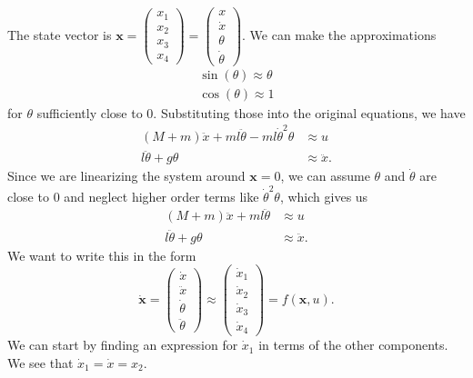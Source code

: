 \documentclass[12pt]{article}
\newcommand{\dx}{\dot{x}}
\newcommand{\dth}{\dot{\theta}}
\newcommand{\bx}{\textbf{x}}
\newcommand{\dbx}{\dot{\bx}}
\newcommand{\ddx}{\ddot{x}}
\newcommand{\ddth}{\ddot{\theta}}
\begin{document}
The state vector is $\bx = \begin{pmatrix} x_1 \\ x_2 \\ x_3 \\ x_4 \end{pmatrix} = \begin{pmatrix} x \\ \dx \\ \theta \\ \dth \end{pmatrix}$. We can make the approximations
\begin{align*}
\sin(\theta) \approx \theta \\
\cos(\theta) \approx 1
\end{align*}
for $\theta$ sufficiently close to $0$. Substituting those into the original equations, we have
\begin{align*}
(M + m)\ddx + ml\ddth - ml\dot{\theta}^2\theta &\approx u \\
l\ddth + g\theta &\approx \ddx.
\end{align*}
Since we are linearizing the system around $\bx = 0$, we can assume $\theta$ and $\dth$ are close to $0$ and neglect higher order terms like $\dth^2\theta$, which gives us
\begin{align}
\label{eq:1}
(M + m)\ddx + ml\ddth &\approx u \\
\label{eq:2}
l\ddth + g\theta &\approx \ddx.
\end{align}
We want to write this in the form
$$\dbx = \begin{pmatrix} \dx \\ \ddx \\ \dth \\ \ddth \end{pmatrix} \approx \begin{pmatrix} \dx_1 \\ \dx_2 \\ \dx_3 \\ \dx_4 \end{pmatrix} = f(\bx, u).$$
We can start by finding an expression for $\dx_1$ in terms of the other components. We see that $\dx_1 = \dx = x_2$. \\
\end{document}
